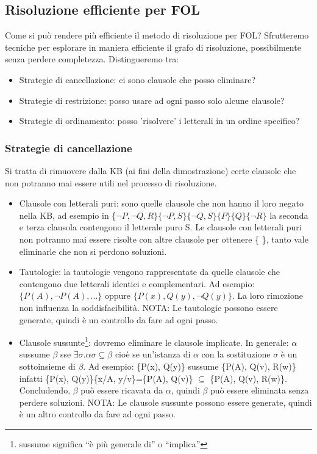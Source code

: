 \documentclass{article}
\begin{document}
\subsection{Risoluzione efficiente per FOL}
Come si può rendere più efficiente il metodo di risoluzione per FOL? Sfrutteremo tecniche per esplorare in maniera efficiente il grafo di risoluzione, possibilmente senza perdere completezza. Distingueremo tra:
\begin{itemize}
    \item Strategie di cancellazione: ci sono clausole che posso eliminare?
    \item Strategie di restrizione: posso usare ad ogni passo solo alcune clausole?
    \item Strategie di ordinamento: posso 'risolvere' i letterali in un ordine specifico?
\end{itemize}
\subsubsection{Strategie di cancellazione}
Si tratta di rimuovere dalla KB (ai fini della dimostrazione) certe clausole che non potranno mai essere utili nel processo di risoluzione.
\begin{itemize}
    \item Clausole con letterali puri: sono quelle clausole che non hanno il loro negato nella KB, ad esempio in \{$\neg P, \neg Q, R\}  \{\neg P, S\}  \{\neg Q, S\} \{P\} \{Q\} \{\neg R\}$  la seconda e terza clausola contengono il letterale puro S. Le clausole con letterali puri non potranno mai essere risolte con altre clausole per ottenere \{ \}, tanto vale eliminarle che non si perdono soluzioni.
    \item Tautologie: la tautologie vengono rappresentate da quelle clausole che contengono due letterali identici e complementari. Ad esempio: $\{P(A), \neg P(A), ...\}$ oppure $\{P(x), Q(y), \neg Q(y)\}$. La loro rimozione non influenza la soddisfacibilità. \newline 
    NOTA: Le tautologie possono essere generate, quindi è un controllo da fare ad ogni passo.
    \item Clausole sussunte\footnote{sussume significa “è più generale di” o “implica”}: dovremo eliminare le clausole implicate. In generale: $\alpha$ sussume $\beta$ sse $\exists \sigma . \alpha \sigma \subseteq \beta$ cioè se un’istanza di $\alpha$ con la sostituzione $\sigma$ è un sottoinsieme di $\beta$. \newline
    Ad esempio: \{P(x), Q(y)\} sussume \{P(A), Q(v), R(w)\} infatti \newline \{P(x), Q(y)\}\{x/A, y/v\}=\{P(A), Q(v)\} $\subseteq$ \{P(A), Q(v), R(w)\}. Concludendo, $\beta$ può essere ricavata da $\alpha$, quindi $\beta$ può essere eliminata senza perdere soluzioni. \newline 
    NOTA: Le clausole sussunte possono essere generate, quindi è un altro controllo da fare ad ogni passo.
\end{itemize}
\end{document}
